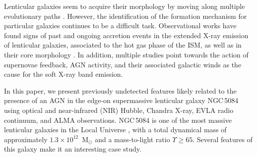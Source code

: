 \documentclass[modern]{aastex631}
\begin{document}

Lenticular galaxies seem to acquire their morphology by moving along multiple evolutionary paths 
\citep[accretion, mergers, secular evolution, thermal stripping of the gas content][]{laurikainen+2010mnras405_1089, larson+1980apj237_692, moore+1996nat379_613, barway+2009mnras394_1991, borlaff+2014aap570_103, elichemoral+2018aap617_113, frasermckelvie+2018mnras481_5580}. However, the identification of the formation mechanism for particular galaxies continues to be a difficult task. Observational works have found signs of past \citep{machacek+2010apj711_1316} and ongoing \citep{wang+2019apj870_132} accretion events in the extended X-ray emission of lenticular galaxies, associated to the hot gas phase of the ISM, as well as in their core morphology \citep{juravnova+2019mnras484_2886}. In addition, multiple studies point towards the action of supernovae feedback, AGN activity, and their associated galactic winds as the cause for the soft X-ray band emission.

In this paper, we present previously undetected features likely related to the presence of an AGN in the edge-on supermassive lenticular galaxy NGC\,5084 \citep[$\alpha=200\fdg0705$, $\delta=-21\fdg8276$ ICRS, $D=	29.9\pm2.1$~Mpc, $z=0.005741$, 6.90~arcsec~kpc$^{-1}$,][Fig.\,\ref{fig:NGC5084_poster}]{gottesman+1986mnras219_759, devaucouleurs+1991book, koribalski+2004aj128_16} using optical and near-infrared (NIR) Hubble, Chandra X-ray, EVLA radio continuum, and ALMA observations. 
NGC\,5084 is one of the most massive lenticular galaxies in the Local Universe \citep[]{ohlson+2024aj167_31}, with a total dynamical mass of approximately $1.3\times10^{12}$~M$_{\odot}$ \citep{koribalski+2004aj128_16} and a mass-to-light ratio $\Upsilon \geq 65$. Several features of this galaxy make it an interesting case study.
\end{document}
